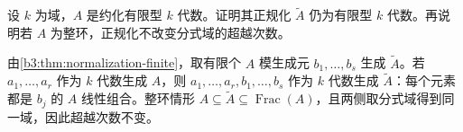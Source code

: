 \begin{exercise}\label{b3:ex:06-finite-type-normalization-algebra}
	设 \(k\) 为域，\(A\) 是约化有限型 \(k\) 代数。证明其正规化 \(\widetilde A\) 仍为有限型 \(k\) 代数。再说明若 \(A\) 为整环，正规化不改变分式域的超越次数。
\end{exercise}
\begin{solution}
	由\cref{b3:thm:normalization-finite}，取有限个 \(A\) 模生成元 \(b_1,\ldots,b_s\) 生成 \(\widetilde A\)。若 \(a_1,\ldots,a_r\) 作为 \(k\) 代数生成 \(A\)，则 \(a_1,\ldots,a_r,b_1,\ldots,b_s\) 作为 \(k\) 代数生成 \(\widetilde A\)：每个元素都是 \(b_j\) 的 \(A\) 线性组合。整环情形 \(A\subseteq\widetilde A\subseteq\operatorname{Frac}(A)\)，且两侧取分式域得到同一域，因此超越次数不变。
\end{solution}
